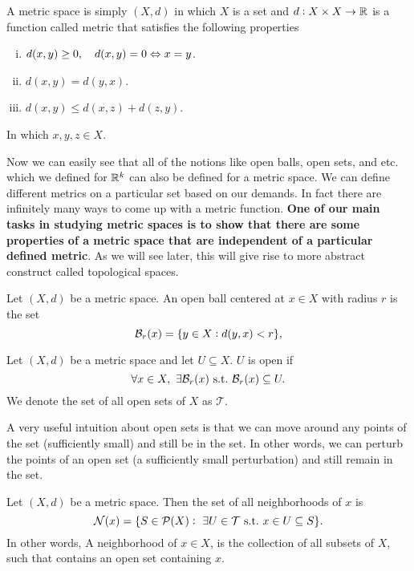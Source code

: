 \begin{defbox}
	A metric space is simply $(X,d)$ in which $X$ is a  set and $d:X\times X \to \mathbb{R}$ is a function called metric that satisfies the following properties
	
	\begin{enumerate}[(i)]
		\item $d(x,y) \geq 0,\quad d(x,y) =0 \Leftrightarrow x=y$.
		\item $d(x,y) = d(y,x)$.
		\item $d(x,y) \leq d(x,z) + d(z,y)$.
	\end{enumerate}
	In which $x,y,z\in X$. 
\end{defbox}
Now we can easily see that all of the notions like open balls, open sets, and etc. which we defined for $\mathbb{R}^k$ can also be defined for a metric space. We can define different metrics on a particular set based on our demands. In fact there are infinitely many ways to come up with a metric function. \textbf{One of our main tasks in studying metric spaces is to show that there are some properties of a metric space that are independent of a particular defined metric}. As we will see later, this will give rise to more abstract construct called topological spaces. 

\begin{defbox}
	Let $(X,d)$ be a metric space. An open ball centered at $x\in X$ with radius $r$ is the set
	\[ \mathcal{B}_{r}(x) = \{ y\in X: d(y,x)<r \}, \]
\end{defbox}


\begin{defbox}
	Let $(X,d)$ be a metric space and let $U\subseteq X$. $U$ is open if 
	\[ \forall x\in X,\ \exists \mathcal{B}_{r}(x) \ \text{s.t.}\  \mathcal{B}_{r}(x) \subseteq U. \]
	We denote the set of all open sets of $X$ as $\mathcal{T}$.
\end{defbox}

A very useful intuition about open sets is that we can move around any points of the set (sufficiently small) and still be in the set. In other words, we can perturb the points of an open set (a sufficiently small perturbation) and still remain in the set. 

\begin{defbox}[Neighborhood of $x$]
	Let $(X,d)$ be a metric space. Then the set of all neighborhoods of $x$ is
	\[ \mathcal{N}(x) = \{ S \in \mathcal{P}(X):\ \exists U \in \mathcal{T} \ \text{s.t.}\  x\in U \subseteq S\}. \]
	In other words, A neighborhood of $x\in X$, is the collection of all subsets of $X$, such that contains an open set containing $x$.
\end{defbox}

